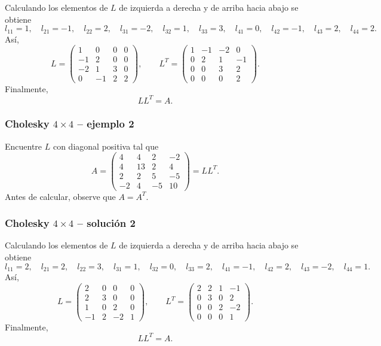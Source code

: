 Calculando los elementos de $L$ de izquierda a derecha y de arriba hacia abajo se obtiene
\[
l_{11}=1,\quad l_{21}=-1,\quad l_{22}=2,\quad l_{31}=-2,\quad l_{32}=1,\quad l_{33}=3,\quad l_{41}=0,\quad l_{42}=-1,\quad l_{43}=2,\quad l_{44}=2.
\]
Así,
\[
L=\begin{pmatrix}1 & 0 & 0 & 0\\-1 & 2 & 0 & 0\\-2 & 1 & 3 & 0\\0 & -1 & 2 & 2\end{pmatrix},\qquad L^T=\begin{pmatrix}1 & -1 & -2 & 0\\0 & 2 & 1 & -1\\0 & 0 & 3 & 2\\0 & 0 & 0 & 2\end{pmatrix}.
\]
Finalmente,
\[
\boxed{LL^T=A}.
\]


\subsubsection*{Cholesky $4\times 4$ -- ejemplo 2}

Encuentre $L$ con diagonal positiva tal que
\[
A=\begin{pmatrix}4 & 4 & 2 & -2\\4 & 13 & 2 & 4\\2 & 2 & 5 & -5\\-2 & 4 & -5 & 10\end{pmatrix}=LL^T.
\]
Antes de calcular, observe que $A=A^T$.


\subsubsection*{Cholesky $4\times 4$ -- solución 2}

Calculando los elementos de $L$ de izquierda a derecha y de arriba hacia abajo se obtiene
\[
l_{11}=2,\quad l_{21}=2,\quad l_{22}=3,\quad l_{31}=1,\quad l_{32}=0,\quad l_{33}=2,\quad l_{41}=-1,\quad l_{42}=2,\quad l_{43}=-2,\quad l_{44}=1.
\]
Así,
\[
L=\begin{pmatrix}2 & 0 & 0 & 0\\2 & 3 & 0 & 0\\1 & 0 & 2 & 0\\-1 & 2 & -2 & 1\end{pmatrix},\qquad L^T=\begin{pmatrix}2 & 2 & 1 & -1\\0 & 3 & 0 & 2\\0 & 0 & 2 & -2\\0 & 0 & 0 & 1\end{pmatrix}.
\]
Finalmente,
\[
\boxed{LL^T=A}.
\]


